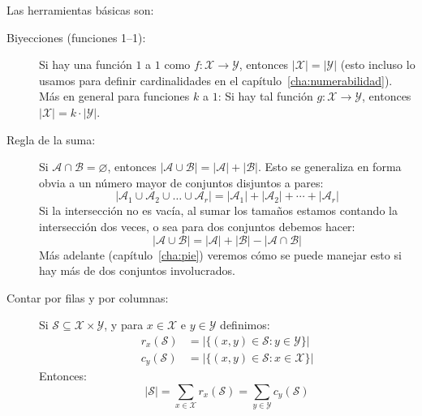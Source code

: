   Las herramientas básicas son:
  \begin{description}
  \item[Biyecciones (funciones 1--1):]
    Si hay una función \(1\) a \(1\)
    como \(f \colon \mathcal{X} \rightarrow \mathcal{Y}\!\),
    entonces \(\lvert \mathcal{X} \rvert
		 = \lvert \mathcal{Y} \rvert\)
    (esto incluso lo usamos para definir cardinalidades
     en el capítulo~\ref{cha:numerabilidad}).
    Más en general para funciones \(k\) a \(1\):
    Si hay tal función
      \(g \colon \mathcal{X} \rightarrow \mathcal{Y}\!\),
    entonces
      \(\lvert \mathcal{X} \rvert
	  = k \cdot \lvert \mathcal{Y} \rvert\).
  \item[Regla de la suma:]
    Si \(\mathcal{A} \cap \mathcal{B} = \varnothing\),
    entonces
      \(\lvert \mathcal{A} \cup \mathcal{B} \rvert
	   = \lvert \mathcal{A} \rvert
	       + \lvert \mathcal{B} \rvert\).
    Esto se generaliza en forma obvia a un número mayor
    de conjuntos disjuntos a pares:
    \begin{equation*}
      \lvert \mathcal{A}_1 \cup \mathcal{A}_2
	\cup \dotso \cup \mathcal{A}_r \rvert
	  = \lvert \mathcal{A}_1 \rvert
	      + \lvert \mathcal{A}_2 \rvert
	      + \dotsb + \lvert \mathcal{A}_r \rvert
    \end{equation*}
    Si la intersección no es vacía,
    al sumar los tamaños estamos contando la intersección dos veces,
    o sea para dos conjuntos debemos hacer:
    \begin{equation*}
      \lvert \mathcal{A} \cup \mathcal{B} \rvert
	 = \lvert \mathcal{A} \rvert + \lvert \mathcal{B} \rvert
	   - \lvert \mathcal{A} \cap \mathcal{B} \rvert
    \end{equation*}
    Más adelante
    (capítulo~\ref{cha:pie})%
    veremos cómo se puede manejar esto
    si hay más de dos conjuntos involucrados.
  \item[Contar por filas y por columnas:]
    Si \(\mathcal{S} \subseteq \mathcal{X} \times \mathcal{Y}\),
    y para \(x \in \mathcal{X}\) e \(y \in \mathcal{Y}\) definimos:
    \begin{align*}
      r_x(\mathcal{S})
	&= \lvert \{(x, y) \in \mathcal{S}
		      \colon y \in \mathcal{Y}\} \rvert \\
      c_y(\mathcal{S})
	&= \lvert \{(x, y) \in \mathcal{S}
		      \colon x \in \mathcal{X}\} \rvert
    \end{align*}
    Entonces:
    \begin{equation*}
      \lvert \mathcal{S} \rvert
	 = \sum_{x \in \mathcal{X}} r_x(\mathcal{S})
	 = \sum_{y \in \mathcal{Y}} c_y(\mathcal{S})
    \end{equation*}


\end{description}
